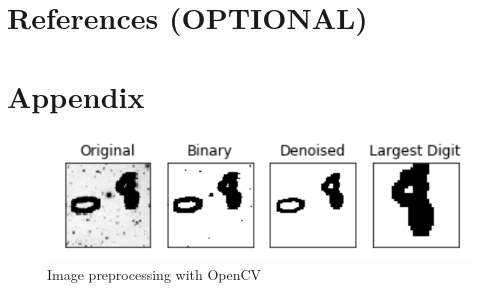 \documentclass[10pt, hidelinks]{article}
\begin{document}
\section*{References (OPTIONAL)}


\section*{Appendix}

\begin{figure}[h]
    \centering
    \includegraphics[width=\textwidth]{preprocessing}
    \caption{Image preprocessing with OpenCV}
    \label{preprocessing}
\end{figure}
\end{document}
